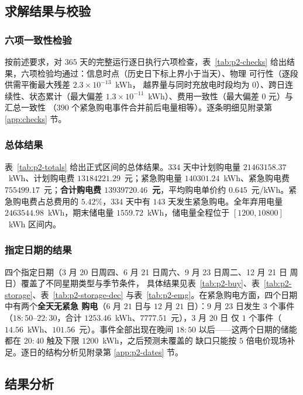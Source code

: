 \documentclass[withoutpreface,bwprint]{cumcmthesis}
\begin{document}
\subsection{求解结果与校验}

\subsubsection{六项一致性检验}

按前述要求，对 $365$ 天的完整运行逐日执行六项检查，表~\ref{tab:p2-checks}
给出结果，六项检验均通过：信息时点（历史日下标上界小于当天）、物理
可行性（逐段供需平衡最大残差 $2.3\times10^{-13}$~kWh，
越界量与同时充放电时段均为 $0$）、跨日连续性、状态累计（最大偏差
$1.3\times10^{-11}$~kWh）、费用一致性（最大偏差 $0$ 元）与汇总一致性
（$390$ 个紧急购电事件合并前后电量相等）。逐条明细见附录第
\ref{app:checks} 节。
\subsubsection{总体结果}

表~\ref{tab:p2-totals} 给出正式区间的总体结果。$334$ 天中计划购电量
$21463158.37$~kWh、计划购电费 $13184221.29$~元；紧急购电量
$140301.24$~kWh、紧急购电费 $755499.17$~元；\textbf{合计购电费
$13939720.46$~元}，平均购电单价约 $0.645$~元/kWh。紧急购电费占总费用的
$5.42\%$，$334$ 天中有 $143$ 天发生紧急购电。全年弃用电量
$2463544.98$~kWh，期末储电量 $1559.72$~kWh，储电量全程位于
$[1200,10800]$~kWh 区间内。



\subsubsection{指定日期的结果}

四个指定日期（3 月 20 日周四、6 月 21 日周六、9 月 23 日周二、12 月 21 日
周日）覆盖了不同星期类型与季节条件，
具体结果见表~\ref{tab:p2-buy}、表~\ref{tab:p2-storage}、表~\ref{tab:p2-storage-dec}
与表~\ref{tab:p2-emg}。在紧急购电方面，四个日期中有两个\textbf{全天无紧急
购电}（$6$ 月 $21$ 日与 $12$ 月 $21$ 日）：$9$ 月 $23$ 日发生 $3$ 个事件
（$18{:}50$--$22{:}30$，合计 $1253.46$~kWh、$7777.51$~元），$3$ 月 $20$ 日
仅 $1$ 个事件（$14.56$~kWh、$101.56$~元）。事件全部出现在晚间 $18{:}50$
以后——这两个日期的储能都在 $20{:}40$ 触及下限 $1200$~kWh，之后预测未覆盖的
缺口只能按 $5$ 倍电价现场补足。逐日的结构分析见附录第 \ref{app:p2-dates} 节。
\subsection{结果分析}
\end{document}
